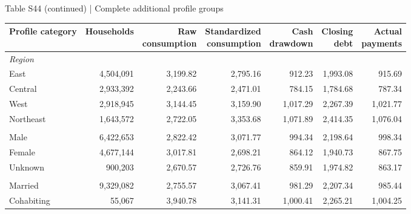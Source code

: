 \documentclass[10pt]{article}
\begin{document}
\clearpage
\begin{center}\begin{minipage}{\textwidth}\fontsize{7.7}{9.3}\selectfont
Table S44 (continued) | Complete additional profile groups
\par\vspace{4pt}
\begin{tabularx}{\textwidth}{@{}Xrrrrrr@{}}\toprule
Profile category & Households & \shortstack[r]{Raw\\consumption} & \shortstack[r]{Standardized\\consumption} & \shortstack[r]{Cash\\drawdown} & \shortstack[r]{Closing\\debt} & \shortstack[r]{Actual\\payments} \\
\midrule
\multicolumn{7}{l}{\textit{Region}} \\

East & 4,504,091 & 3,199.82 & 2,795.16 & 912.23 & 1,993.08 & 915.69 \\

Central & 2,933,392 & 2,243.66 & 2,471.01 & 784.15 & 1,784.68 & 787.34 \\

West & 2,918,945 & 3,144.45 & 3,159.90 & 1,017.29 & 2,267.39 & 1,021.77 \\

Northeast & 1,643,572 & 2,722.05 & 3,353.68 & 1,071.89 & 2,414.35 & 1,076.04 \\

\addlinespace[3pt]
\multicolumn{7}{l}{\textit{Gender}} \\

Male & 6,422,653 & 2,822.42 & 3,071.77 & 994.34 & 2,198.64 & 998.34 \\

Female & 4,677,144 & 3,017.81 & 2,698.21 & 864.12 & 1,940.73 & 867.75 \\

Unknown & 900,203 & 2,670.57 & 2,726.76 & 859.91 & 1,974.82 & 863.17 \\

\addlinespace[3pt]
\multicolumn{7}{l}{\textit{Marital status}} \\

Married & 9,329,082 & 2,755.57 & 3,067.41 & 981.29 & 2,207.34 & 985.44 \\

Cohabiting & 55,067 & 3,940.78 & 3,141.31 & 1,000.41 & 2,265.21 & 1,004.25 \\


\end{tabularx}
\end{minipage}
\end{center}
\end{document}
